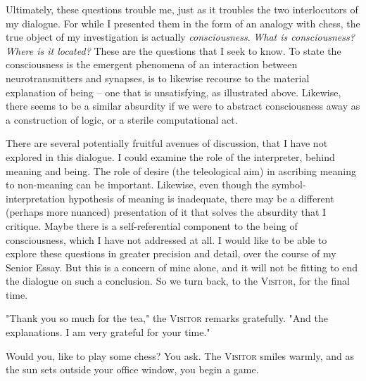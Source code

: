 Ultimately, these questions trouble me, just as it troubles the two interlocutors of my dialogue. For while I presented them in the form of an analogy with chess, the true object of my investigation is actually \emph{consciousness}. \emph{What is consciousness? Where is it located?} These are the questions that I seek to know. To state the consciousness is the emergent phenomena of an interaction between neurotransmitters and synapses, is to likewise recourse to the material explanation of being -- one that is unsatisfying, as illustrated above. Likewise, there seems to be a similar absurdity if we were to abstract consciousness away as a construction of logic, or a sterile computational act.

\noindent
There are several potentially fruitful avenues of discussion, that I have not explored in this dialogue. I could examine the role of the interpreter, behind meaning and being. The role of desire (the teleological aim) in ascribing meaning to non-meaning can be important. Likewise, even though the symbol-interpretation hypothesis of meaning is inadequate, there may be a different (perhaps more nuanced) presentation of it that solves the absurdity that I critique. Maybe there is a self-referential component to the being of consciousness, which I have not addressed at all. I would like to be able to explore these questions in greater precision and detail, over the course of my Senior Essay. But this is a concern of mine alone, and it will not be fitting to end the dialogue on such a conclusion. So we turn back, to the \textsc{Visitor}, for the final time.

"Thank you so much for the tea," the \textsc{Visitor} remarks gratefully. "And the explanations. I am very grateful for your time."

Would you, like to play some chess? You ask. The \textsc{Visitor} smiles warmly, and as the sun sets outside your office window, you begin a game.

%
%
%
